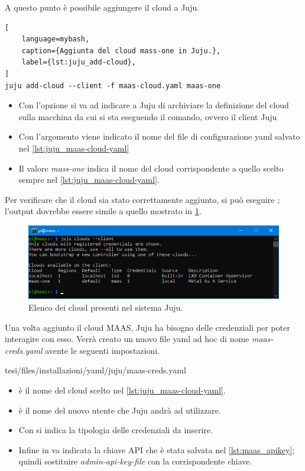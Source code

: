 \bigskip\noindent
A questo punto è possibile aggiungere il cloud a Juju.
% 
\begin{lstlisting}[
    language=mybash, 
    caption={Aggiunta del cloud mass-one in Juju.}, 
    label={lst:juju_add-cloud},
]
juju add-cloud --client -f maas-cloud.yaml maas-one
\end{lstlisting}
%
\begin{itemize}
    \item Con l'opzione  si va ad indicare a Juju di archiviare la definizione del cloud sulla macchina da cui si sta eseguendo il comando, ovvero il client Juju
    
    \item Con l'argomento  viene indicato il nome del file di configurazione yaml salvato nel \cref{lst:juju_maas-cloud-yaml}
    \item Il valore \emph{mass-one} indica il nome del cloud corrispondente a quello scelto sempre nel \cref{lst:juju_maas-cloud-yaml}.
\end{itemize}
% 
Per verificare che il cloud sia stato correttamente aggiunto, si può eseguire ; 
% 
l'output dovrebbe essere simile a quello mostrato in \cref{fig:juju_cloud_mass-one}.
% 
\begin{figure}[H]
    \centering
    \includegraphics[width=1\linewidth]{tesi/files/immagini/juju/juju clouds}
    \caption{Elenco dei cloud presenti nel sistema Juju.}
    \label{fig:juju_cloud_mass-one}
\end{figure}

\bigskip\noindent
Una volta aggiunto il cloud MAAS, Juju ha bisogno delle credenziali per poter interagire con esso.
Verrà creato un nuovo file yaml ad hoc di nome \emph{maas-creds.yaml} avente le seguenti impostazioni.
% 

{tesi/files/installazioni/yaml/juju/maas-creds.yaml}
%
\begin{itemize}
    \item {} è il nome del cloud scelto nel \cref{lst:juju_maas-cloud-yaml}.

    \item {} è il nome del nuovo utente che Juju andrà ad utilizzare.

    \item Con  si indica la tipologia delle credenziali da inserire.

    \item Infine in  va indicata la chiave API che è stata salvata nel \cref{lst:maas_apikey};
    quindi sostituire \emph{admin-api-key-file} con la corrispondente chiave.
\end{itemize}

